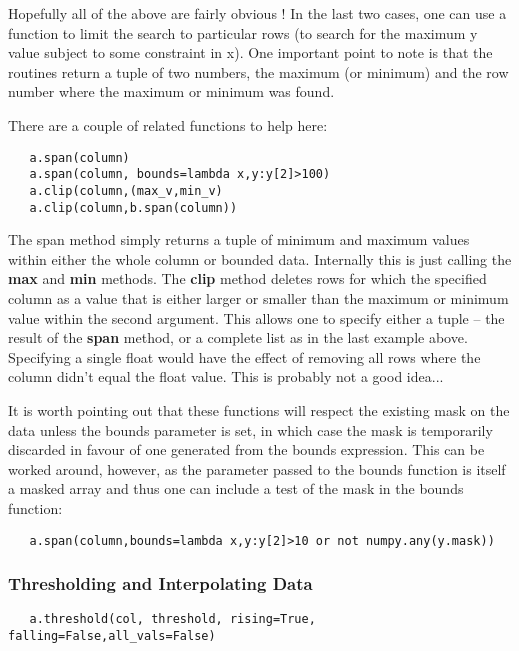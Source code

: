 \documentclass[a4paper,11pt]{scrartcl}
\begin{document}
Hopefully all of the above are fairly obvious ! In the last two cases, one can use a function to limit the search to particular rows (\eg to search for the maximum y value subject to some constraint in x). One important point to note is that the routines return a tuple of two numbers, the maximum (or minimum) and the row number where the maximum or minimum was found.

There are a couple of related functions to help here:

\begin{lstlisting}
   a.span(column)
   a.span(column, bounds=lambda x,y:y[2]>100)
   a.clip(column,(max_v,min_v)
   a.clip(column,b.span(column))
\end{lstlisting}

The span method simply returns a tuple of minimum and maximum values within either the whole column or bounded data. Internally this is just calling the \textbf{max} and \textbf{min} methods. The \textbf{clip} method deletes rows for which the specified column as a value that is either larger or smaller than the maximum or minimum value within the second argument. This allows one to specify either a tuple -- \eg the result of the \textbf{span} method, or a complete list as in the last example above. Specifying a single float would have the effect of removing all rows where the column didn't equal the float value. This is probably not a good idea...

It is worth pointing out that these functions will respect the existing mask on the data unless the bounds parameter is set, in which case the mask is temporarily discarded in favour of one generated from the bounds expression. This can be worked around, however, as the parameter passed to the bounds function is itself a masked array and thus one can include a test of the mask in the bounds function:

\begin{lstlisting}
   a.span(column,bounds=lambda x,y:y[2]>10 or not numpy.any(y.mask))
\end{lstlisting}

\subsubsection{Thresholding and Interpolating Data}
\begin{lstlisting}
   a.threshold(col, threshold, rising=True, falling=False,all_vals=False)
\end{lstlisting}
\end{document}
